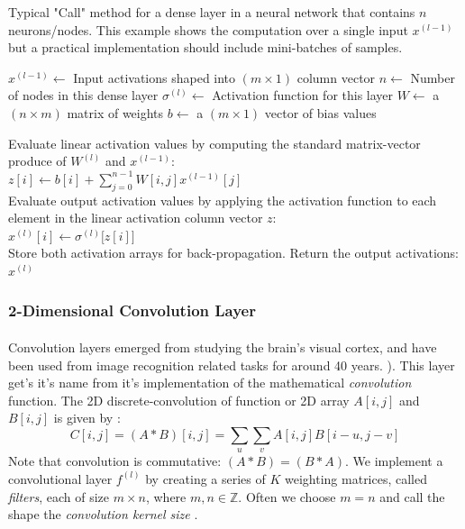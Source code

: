 \documentclass[12pt,letterpaper]{article}
\begin{document}
\begin{algorithm}[H]
\caption{Typical "Call" method for a dense layer in a neural network that contains $n$ neurons/nodes. This example shows the computation over a single input $x^{(l-1)}$ but a practical implementation should include mini-batches of samples.}
\label{alg-CallDense}

\begin{algorithmic}
\REQUIRE $x^{(l-1)} \leftarrow$ Input activations shaped into $(m \times 1)$ column vector
\REQUIRE $n \leftarrow$ Number of nodes in this dense layer
\REQUIRE $\sigma^{(l)} \leftarrow$ Activation function for this layer
\REQUIRE $W \leftarrow$ a $(n \times m)$ matrix of weights
\REQUIRE $b \leftarrow$ a $(m \times 1)$ vector of bias values

Evaluate linear activation values by computing the standard matrix-vector produce of $W^{(l)}$ and $x^{(l-1)}$:\\
$z[i] \leftarrow b[i] + \sum_{j=0}^{n-1} W[i,j] x^{(l-1)}[j]$ \\
Evaluate output activation values by applying the activation function to each element in the linear activation column vector $z$:\\
$x^{(l)}[i] \leftarrow \sigma^{(l)}\big[ z[i] \big]$ \\

Store both activation arrays for back-propagation. Return the output activations:\\
\RETURN $x^{(l)}$

\end{algorithmic}
\end{algorithm}


\subsubsection{2-Dimensional Convolution Layer}
\label{subsubsec-Conv2DLayer}

\paragraph*{}Convolution layers emerged from studying the brain's visual cortex, and have been used from image recognition related tasks for around 40 years. \cite{Geron,Loy}). This layer get's it's name from it's implementation of the mathematical \textit{convolution} function. The 2D discrete-convolution of function or 2D array $A[i,j]$ and $B[i,j]$ is given by \cite{Goodfellow}:
\begin{equation}
\label{eqn-convolution}
C[i,j] = (A * B)[i,j] = \sum_{u}\sum_{v} A[i,j]B[i - u,j - v]
\end{equation}
Note that convolution is commutative: $(A * B) = (B * A)$. We implement a convolutional layer $f^{(l)}$ by creating a series of $K$ weighting matrices, called \textit{filters}, each of size $m \times n$, where $m,n \in \mathbb{Z}$. Often we choose $m = n$ and call the shape the \textit{convolution kernel size} \cite{Loy, Goodfellow}.
\end{document}
